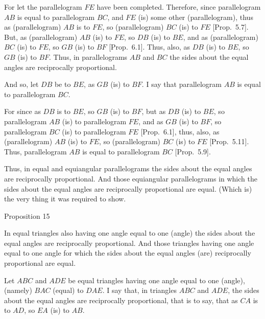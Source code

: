 \epsfysize=2.2in
\centerline{}

For let the parallelogram $FE$ have been completed. Therefore, since parallelogram $AB$ is equal to parallelogram $BC$, and $FE$ (is) some
other (parallelogram), thus as (parallelogram) $AB$ is to $FE$, so (parallelogram) $BC$ (is) to $FE$ [Prop.~5.7]. But, as (parallelogram) $AB$ (is) to $FE$, so $DB$
(is) to $BE$, and as (parallelogram) $BC$ (is) to $FE$, so $GB$ (is) to $BF$ [Prop.~6.1]. Thus, also, as $DB$ (is) to
$BE$, so $GB$ (is) to $BF$. Thus, in parallelograms $AB$ and $BC$
the sides about the equal angles are reciprocally proportional.

And so, let $DB$ be to $BE$, as $GB$ (is) to $BF$. I say that parallelogram
$AB$ is equal to parallelogram $BC$.

For since as $DB$ is to $BE$, so $GB$ (is) to $BF$, but as $DB$ (is) to $BE$, so
parallelogram $AB$ (is) to parallelogram $FE$, and as $GB$ (is) to $BF$,
so parallelogram $BC$ (is) to parallelogram $FE$  [Prop.~6.1], thus, also, as (parallelogram) $AB$ (is)
to $FE$, so (parallelogram) $BC$ (is) to $FE$ [Prop.~5.11].
Thus,  parallelogram $AB$ is equal to parallelogram $BC$ [Prop.~5.9].

Thus, in equal and equiangular parallelograms the
sides about the equal angles are reciprocally proportional. And those
equiangular parallelograms in which the sides about the equal
angles are reciprocally proportional are equal. (Which is) the very thing
it was required to show.


\begin{center}
{\large Proposition 15}
\end{center}

In equal triangles also having one angle equal to
one (angle) the sides about the equal angles are reciprocally proportional.
And those triangles having one angle equal to one angle for which 
the sides about the equal angles (are) reciprocally proportional are equal.

Let $ABC$ and $ADE$ be equal triangles having one angle equal to
one (angle), (namely) $BAC$ (equal) to $DAE$. I say that, in triangles
$ABC$ and $ADE$, the sides about the equal angles are reciprocally
proportional, that is to say, that as $CA$ is to $AD$, so $EA$ (is) to $AB$.

\epsfysize=2.2in
\centerline{}

